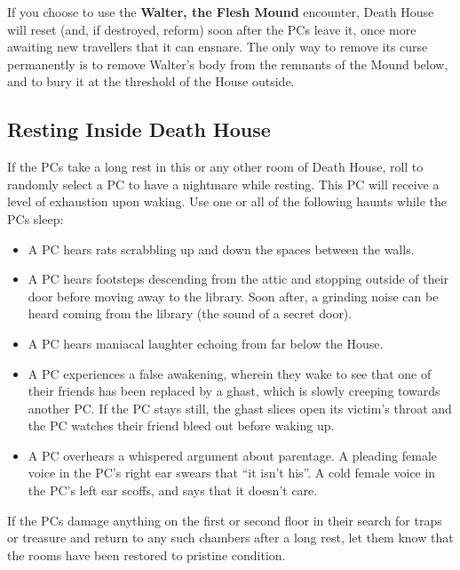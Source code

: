 \documentclass[a4paper,11pt]{article}
\begin{document}
If you choose to use the \textbf{Walter, the Flesh Mound} encounter, Death House will reset (and, if destroyed,
reform) soon after the PCs leave it, once more awaiting new travellers that it can ensnare. The only way to
remove its curse permanently is to remove Walter's body from the remnants of the Mound below, and to bury it
at the threshold of the House outside.


\pagebreak
\subsection*{Resting Inside Death House}
\label{sec:RestingInsideDeathHouse}
If the PCs take a long rest in this or any other room of Death House, roll to randomly select a PC to have
a nightmare while resting. This PC will receive a level of exhaustion upon waking. Use one or all of the
following haunts while the PCs sleep:
\begin{itemize}
  \item A PC hears rats scrabbling up and down the spaces between the walls.
  \item A PC hears footsteps descending from the attic and stopping outside of their door before moving away
  to the library. Soon after, a grinding noise can be heard coming from the library (the sound of a secret door).
  \item A PC hears maniacal laughter echoing from far below the House.
  \item A PC experiences a false awakening, wherein they wake to see that one of their friends has been replaced
  by a ghast, which is slowly creeping towards another PC. If the PC stays still, the ghast slices open its
  victim's throat and the PC watches their friend bleed out before waking up.
  \item A PC overhears a whispered argument about parentage. A pleading female voice in the PC's right ear
  swears that ``it isn't his''. A cold female voice in the PC's left ear scoffs, and says that it doesn't care.
\end{itemize}
If the PCs damage anything on the first or second floor in their search for traps or treasure and return to
any such chambers after a long rest, let them know that the rooms have been restored to pristine condition.
\end{document}
